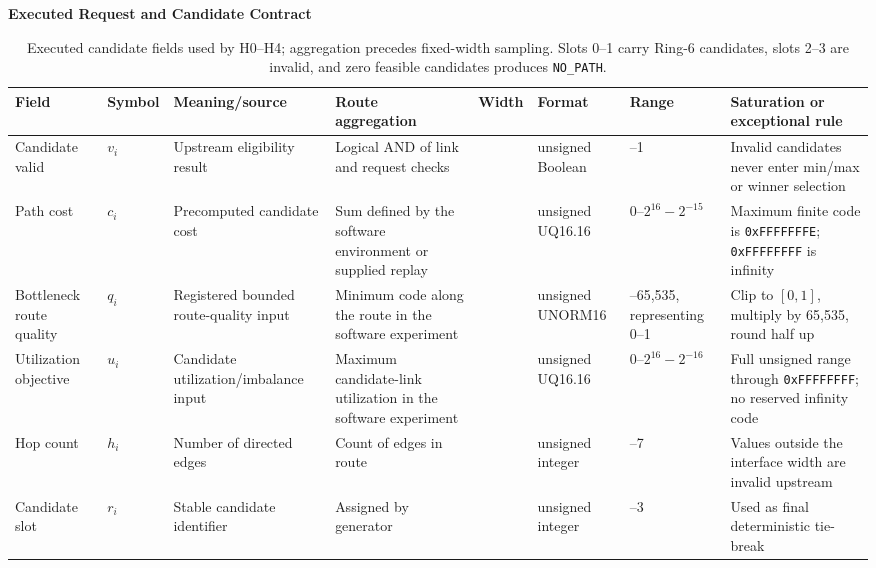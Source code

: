 \clearpage
{}
{}
\begin{landscape}
\begin{table}[p]
\centering
{\large\bfseries \thesection\quad Executed Request and Candidate Contract\par}
\vspace{0.8\baselineskip}
\scriptsize
\setlength{\tabcolsep}{4pt}
\caption{Executed candidate fields used by H0--H4; aggregation precedes
fixed-width sampling. Slots 0--1 carry Ring-6 candidates, slots 2--3 are invalid,
and zero feasible candidates produces \texttt{NO\_PATH}.}
\label{tab:candidate-descriptor}
\begin{tabularx}{\linewidth}{@{}>{\raggedright\arraybackslash}p{2.1cm}>{\raggedright\arraybackslash}p{1.3cm}>{\raggedright\arraybackslash}p{3.2cm}>{\raggedright\arraybackslash}p{2.7cm}>{\raggedright\arraybackslash}p{1.5cm}>{\raggedright\arraybackslash}p{2.0cm}>{\raggedright\arraybackslash}p{2.0cm}>{\raggedright\arraybackslash}X@{}}
\toprule
\textbf{Field} & \textbf{Symbol} & \textbf{Meaning/source} &
\textbf{Route aggregation} & \textbf{Width} & \textbf{Format} &
\textbf{Range} & \textbf{Saturation or exceptional rule}\\
\midrule
Candidate valid & $v_i$ & Upstream eligibility result & Logical AND of link and
request checks & 1 & unsigned Boolean & 0--1 & Invalid candidates never enter
min/max or winner selection\\
Path cost & $c_i$ & Precomputed candidate cost & Sum defined by the software
environment or supplied replay & 32 & unsigned UQ16.16 & $0$--$2^{16}-2^{-15}$ &
Maximum finite code is \texttt{0xFFFFFFFE}; \texttt{0xFFFFFFFF} is infinity\\
Bottleneck route quality & $q_i$ & Registered bounded route-quality input & Minimum
code along the route in the software experiment & 16 & unsigned UNORM16 &
0--65,535, representing 0--1 & Clip to $[0,1]$, multiply by 65,535, round half up\\
Utilization objective & $u_i$ & Candidate utilization/imbalance input & Maximum
candidate-link utilization in the software experiment & 32 & unsigned UQ16.16 &
$0$--$2^{16}-2^{-16}$ & Full unsigned range through \texttt{0xFFFFFFFF}; no
reserved infinity code\\
Hop count & $h_i$ & Number of directed edges & Count of edges in route & 3 &
unsigned integer & 0--7 & Values outside the interface width are invalid upstream\\
Candidate slot & $r_i$ & Stable candidate identifier & Assigned by generator & 2 &
unsigned integer & 0--3 & Used as final deterministic tie-break\\
\bottomrule
\end{tabularx}
\end{table}
\end{landscape}

